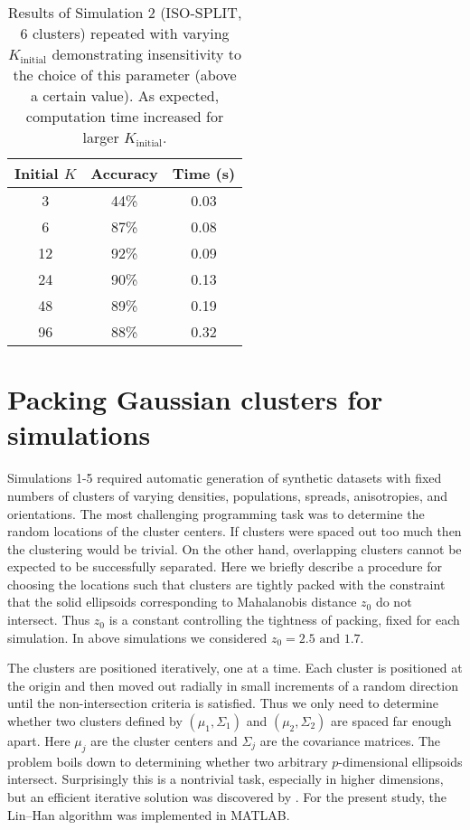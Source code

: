 \documentclass[10pt]{article}
\begin{document}
\begin{table}[t]
  \centering
\begin{tabular}{c|c|c|}
	\textbf{Initial $K$} & \textbf{Accuracy} & \textbf{Time (s)} \\
	\hline
	3 & 44\% & 0.03 \\
6 & 87\% & 0.08 \\
12 & 92\% & 0.09 \\
24 & 90\% & 0.13 \\
48 & 89\% & 0.19 \\
96 & 88\% & 0.32 \\
\end{tabular}
\caption{
\label{table:initial_K_dependence}
Results of Simulation 2 (ISO-SPLIT, 6 clusters) repeated with varying $K_\text{initial}$ demonstrating insensitivity to the choice of this parameter (above a certain value). As expected, computation time increased for larger $K_\text{initial}$.
}
\end{table}

\section {Packing Gaussian clusters for simulations}
\label{appendixPacking}

Simulations 1-5 required automatic generation of synthetic datasets with fixed numbers of clusters of varying densities, populations, spreads, anisotropies, and orientations. The most challenging programming task was to determine the random locations of the cluster centers. If clusters were spaced out too much then the clustering would be trivial. On the other hand, overlapping clusters cannot be expected to be successfully separated. Here we briefly describe a procedure for choosing the locations such that clusters are tightly packed with the constraint that the solid ellipsoids corresponding to Mahalanobis distance $z_0$ do not intersect. Thus $z_0$ is a constant controlling the tightness of packing, fixed for each simulation. In above simulations we considered $z_0=2.5\text{ and }1.7$.

The clusters are positioned iteratively, one at a time. Each cluster is positioned at the origin and then moved out radially in small increments of a random direction until the non-intersection criteria is satisfied. Thus we only need to determine whether two clusters defined by $(\mu_1,\Sigma_1)$ and $(\mu_2,\Sigma_2)$ are spaced far enough apart. Here $\mu_j$ are the cluster centers and $\Sigma_j$ are the covariance matrices. The problem boils down to determining whether two arbitrary $p$-dimensional ellipsoids intersect. Surprisingly this is a nontrivial task, especially in higher dimensions, but an efficient iterative solution was discovered by \citet{ellipsoid-distance}. For the present study, the Lin--Han algorithm was implemented in MATLAB.



\end{document}
